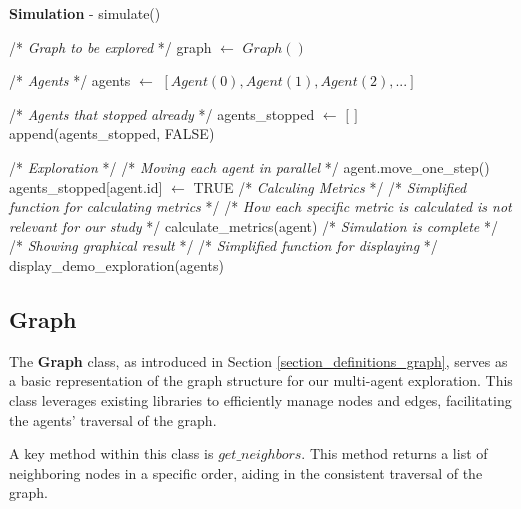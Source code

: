 \begin{algorithm}
\caption{\textbf{Simulation} - simulate()}
\label{alg:simulate}
\begin{algorithmic}

    \State /* \textit{Graph to be explored} */
    \State graph $\gets$ $Graph()$

    \State /* \textit{Agents} */
    \State agents $\gets$ $[Agent(0), Agent(1), Agent(2), ...]$
    \State

    \State /* \textit{Agents that stopped already} */
    \State agents\_stopped $\gets$ $[$ $ ]$
        \State append(agents\_stopped, FALSE)
    \EndFor
    \State

    \State /* \textit{Exploration} */
            \State /* \textit{Moving each agent in parallel} */
            \State agent.move\_one\_step()
                \State agents\_stopped[agent.id] $\gets$ TRUE
            \EndIf
        \EndFor
    \EndWhile
    \State 
    \State /* \textit{Calculing Metrics} */
        \State /* \textit{Simplified function for calculating metrics} */
        \State /* \textit{How each specific metric is calculated is not relevant for our study} */
        \State calculate\_metrics(agent)
    \EndFor
    \State
    \State /* \textit{Simulation is complete} */
    \State /* \textit{Showing graphical result} */
    \State /* \textit{Simplified function for displaying} */
    \State display\_demo\_exploration(agents)
\end{algorithmic}
\end{algorithm}
    

\subsection{Graph}
\label{section_modeling_graph}

The \textbf{Graph} class, as introduced in Section \ref{section_definitions_graph},
serves as a basic representation of the graph structure for our multi-agent exploration.
This class leverages existing libraries to efficiently manage nodes and edges,
facilitating the agents' traversal of the graph.

A key method within this class is $get\_neighbors$.
This method returns a list of neighboring nodes in a specific order, aiding in the consistent traversal of the graph.

